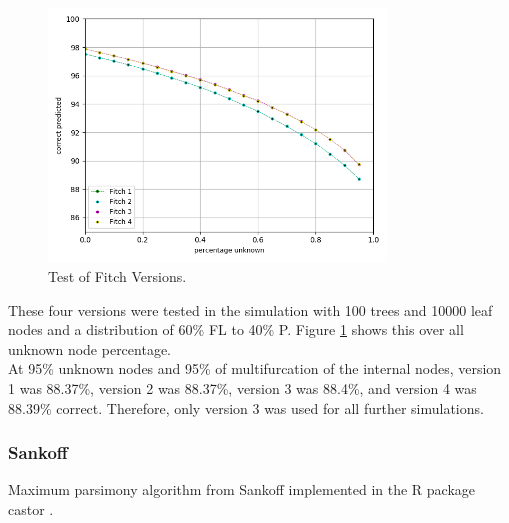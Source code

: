       \begin{figure}
        \centering
        \includegraphics[width=0.8\textwidth]{Figures/simulation_fitch_evaluation.png}
        \caption{Test of Fitch Versions.}
        \label{fig:Fitch versions}
      \end{figure}
      These four versions were tested in the simulation with 100 trees and 10000 leaf nodes and a
        distribution of 60\% FL to 40\% P. Figure \ref{fig:Fitch versions} shows this over all unknown 
        node percentage. \\
      At 95\% unknown nodes and 95\% of multifurcation of the internal nodes, version 1 was 88.37\%, 
        version 2 was 88.37\%, version 3 was 88.4\%, and version 4 was 88.39\% correct. Therefore, 
        only version 3 was used for all further simulations.
        


    \subsubsection{Sankoff}
      Maximum parsimony algorithm from Sankoff implemented in the R package castor \cite{Louca2017}. \\

